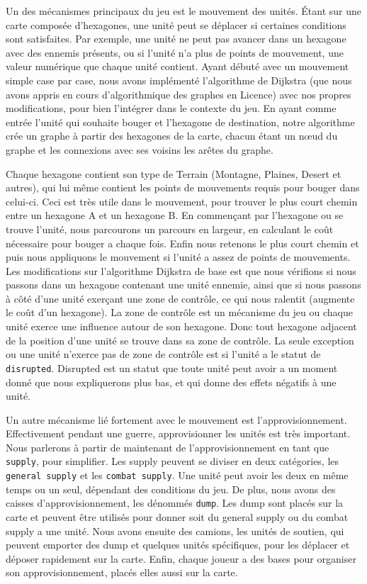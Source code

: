 Un des mécanismes principaux du jeu est le mouvement des unités.
Étant sur une carte composée d'hexagones, une unité peut se déplacer si certaines conditions sont satisfaites.
Par exemple, une unité ne peut pas avancer dans un hexagone avec des ennemis présents, ou si l'unité n'a plus de
points de mouvement, une valeur numérique que chaque unité contient. Ayant débuté avec un mouvement simple case
par case, nous avons implémenté l'algorithme de Dijkstra (que nous avons appris en cours d'algorithmique des graphes en Licence) 
avec nos propres modifications, pour bien l'intégrer dans
le contexte du jeu. En ayant comme entrée l'unité qui souhaite bouger et l'hexagone de destination, notre algorithme
crée un graphe à partir des hexagones de la carte, chacun étant un nœud du graphe et les connexions avec ses voisins
les arêtes du graphe.

Chaque hexagone contient son type de Terrain (Montagne, Plaines, Desert et autres), qui lui même contient les points
de mouvements requis pour bouger dans celui-ci. Ceci est très utile dans le mouvement, pour trouver le plus court
chemin entre un hexagone A et un hexagone B. En commençant par l'hexagone ou se trouve l'unité, nous parcourons un
parcours en largeur, en calculant le coût nécessaire pour bouger a chaque fois. Enfin nous retenons le plus court
chemin et puis nous appliquons le mouvement si l'unité a assez de points de mouvements. Les modifications sur
l'algorithme Dijkstra de base est que nous vérifions si nous passons dans un hexagone contenant une unité ennemie,
ainsi que si nous passons à côté d'une unité exerçant une zone de contrôle, ce qui nous ralentit (augmente le coût
d'un hexagone). La zone de contrôle est un mécanisme du jeu ou chaque unité exerce une influence autour de son
hexagone. Donc tout hexagone adjacent de la position d'une unité se trouve dans sa zone de contrôle.
La seule exception ou une unité n'exerce pas de zone de contrôle est si l'unité a le statut de {\tt disrupted}.
Disrupted est un statut que toute unité peut avoir a un moment donné que nous expliquerons plus bas, et qui donne
des effets négatifs à une unité.

Un autre mécanisme lié fortement avec le mouvement est l'approvisionnement. Effectivement pendant une guerre,
approvisionner les unités est très important. Nous parlerons à partir de maintenant de l'approvisionnement en
tant que {\tt supply}, pour simplifier. Les supply peuvent se diviser en deux catégories, les {\tt general supply} et les
{\tt combat supply}. Une unité peut avoir les deux en même temps ou un seul, dépendant des conditions du jeu. De plus,
nous avons des caisses d'approvisionnement, les dénommés {\tt dump}. Les dump sont placés sur la carte et peuvent
être utilisés pour donner soit du general supply ou du combat supply a une unité. Nous avons ensuite des camions,
les unités de soutien, qui peuvent emporter des dump et quelques unités spécifiques, pour les déplacer et déposer
rapidement sur la carte. Enfin, chaque joueur a des bases pour organiser son approvisionnement, placés elles aussi
sur la carte.

